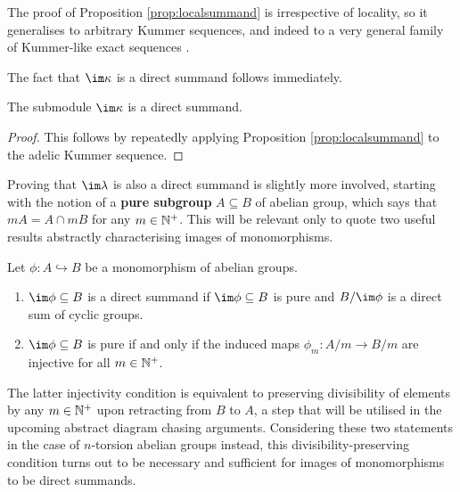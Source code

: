 \begin{remark}
The proof of Proposition \ref{prop:localsummand} is irrespective of locality, so it generalises to arbitrary Kummer sequences, and indeed to a very general family of Kummer-like exact sequences \cite[Theorem 1.1]{GG18}.
\end{remark}

The fact that $ \im \kappa $ is a direct summand follows immediately.

\begin{corollary}
\label{cor:localsummand}
The submodule $ \im \kappa $ is a direct summand.
\end{corollary}

\begin{proof}
This follows by repeatedly applying Proposition \ref{prop:localsummand} to the adelic Kummer sequence.
\end{proof}

Proving that $ \im \lambda $ is also a direct summand is slightly more involved, starting with the notion of a \textbf{pure subgroup} $ A \subseteq B $ of abelian group, which says that $ mA = A \cap mB $ for any $ m \in \mathbb{N}^+ $. This will be relevant only to quote two useful results abstractly characterising images of monomorphisms.

\begin{lemma}
\label{lem:imagepure}
Let $ \phi : A \hookrightarrow B $ be a monomorphism of abelian groups.
\begin{enumerate}
\item $ \im \phi \subseteq B $ is a direct summand if $ \im \phi \subseteq B $ is pure and $ B / \im \phi $ is a direct sum of cyclic groups.
\item $ \im \phi \subseteq B $ is pure if and only if the induced maps $ \phi_m : A / m \to B / m $ are injective for all $ m \in \mathbb{N}^+ $.
\end{enumerate}
\end{lemma}

The latter injectivity condition is equivalent to preserving divisibility of elements by any $ m \in \mathbb{N}^+ $ upon retracting from $ B $ to $ A $, a step that will be utilised in the upcoming abstract diagram chasing arguments. Considering these two statements in the case of $ n $-torsion abelian groups instead, this divisibility-preserving condition turns out to be necessary and sufficient for images of monomorphisms to be direct summands.

\pagebreak

